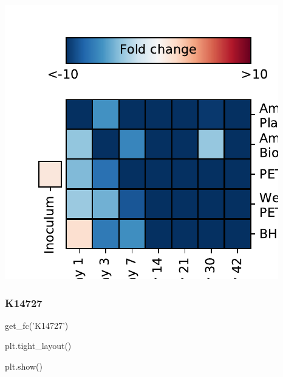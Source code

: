 \documentclass[
]{article}
\newenvironment{Shaded}{\begin{snugshade}}{\end{snugshade}}
\newcommand{\NormalTok}[1]{#1}
\newcommand{\StringTok}[1]{\textcolor[rgb]{0.31,0.60,0.02}{#1}}
\begin{document}
\includegraphics{20-6-15-PET-plastisphere-PICRUSt2_files/figure-latex/plot_fc_K01607-1.pdf}

\hypertarget{k14727-1}{%
\subsubsection{K14727}\label{k14727-1}}

\begin{Shaded}
\begin{Highlighting}[]
\NormalTok{get_fc(}\StringTok{'K14727'}\NormalTok{)}
\end{Highlighting}
\end{Shaded}

\begin{Shaded}
\begin{Highlighting}[]
\NormalTok{plt.tight_layout()}
\end{Highlighting}
\end{Shaded}

\begin{Shaded}
\begin{Highlighting}[]
\NormalTok{plt.show()}
\end{Highlighting}
\end{Shaded}
\end{document}
